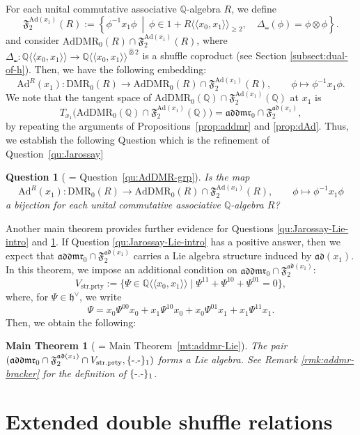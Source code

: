 \documentclass[15pt,oneside,reqno]{amsart}
\newtheorem{qu}[df]{Question}
\newtheorem{mt}{Main Theorem}
\theoremstyle{remark}{
\newtheorem{lem}[df]{Lemma}
\newtheorem{prop}[df]{Proposition}
\newtheorem{ex}[df]{Example}
\newtheorem{rmk}[df]{Remark}
}
\newcommand{\ide}[1]{\mathfrak{#1}}
\newcommand{\Q}{\mathbb{Q}}
\newcommand{\DMR}{\mathrm{DMR}}
\newcommand{\AdDMR}{\mathrm{AdDMR}}
\newcommand{\addmr}{\mathfrak{addmr}}
\newcommand{\Ad}{\mathrm{Ad}}
\newcommand{\ad}{\mathfrak{ad}}
\newcommand{\Fad}{\mathfrak{F}_2^{\ad(x_1)}}
\newcommand{\FAd}{\mathfrak{F}_2^{\Ad(x_1)}}
\newcommand{\cotimes}{\widehat{\otimes}}
\newcommand{\strprty}{\mathrm{str.prty}}
\begin{document}
For each unital commutative associative $\Q$-algebra $R$, we define
\[
\FAd(R)
:=
\left\{
\phi^{-1}x_1\phi
\ \middle|\
\phi\in 1+R\langle\langle x_0,x_1\rangle\rangle_{\ge 2},
\quad
\Delta_{\shuffle}(\phi)=\phi\otimes\phi
\right\}.
\]
and consider $\AdDMR_0(R) \cap \FAd(R)$, where $\Delta_{\shuffle} : \Q\langle\langle x_0,x_1 \rangle\rangle \rightarrow \Q\langle\langle x_0,x_1 \rangle\rangle^{\cotimes 2}$ is a shuffle coproduct (see Section \ref{subsect:dual-of-h}).
Then, we have the following embedding:
\[
\Ad^R(x_1)\colon \DMR_0(R) \longrightarrow \AdDMR_0(R) \cap \FAd(R),\qquad \phi \longmapsto \phi^{-1} x_1 \phi.
\]
We note that the tangent space of $\AdDMR_0(\Q)\cap \FAd(\Q)$ at $x_1$ is
\[
T_{x_1}\bigl(\AdDMR_0(\Q)\cap \FAd(\Q)\bigr)=\addmr_0 \cap \Fad,
\]
by repeating the arguments of Propositions~\ref{prop:addmr} and \ref{prop:dAd}.
Thus, we establish the following Question which is the refinement of Question~\ref{qu:Jarossay}
\begin{qu}[ = Question~\ref{qu:AdDMR-grp}]\label{qu:AdDMR-grp-intro}
Is the map
\[
\Ad^R(x_1)\colon \DMR_0(R) \longrightarrow \AdDMR_0(R)\cap \FAd(R),\qquad \phi \longmapsto \phi^{-1} x_1 \phi
\]
a bijection for each unital commutative associative $\Q$-algebra $R$?
\end{qu}
Another main theorem provides further evidence for Questions \ref{qu:Jarossay-Lie-intro} and \ref{qu:AdDMR-grp-intro}.
If Question \ref{qu:Jarossay-Lie-intro} has a positive answer, then we expect that $\addmr_0 \cap \Fad$ carries a Lie algebra structure induced by $\ad(x_1)$.
In this theorem, we impose an additional condition on $\addmr_0 \cap \Fad$:
\[
V_{\strprty} := \{\Psi \in \Q\langle\langle x_0,x_1 \rangle\rangle \mid \Psi^{11} + \Psi^{10} + \Psi^{01} = 0\},
\]
where, for $\Psi \in \ide{h}^{\vee}$, we write
\[
\Psi = x_0 \Psi^{00} x_0 + x_1 \Psi^{10} x_0 + x_0 \Psi^{01} x_1 + x_1 \Psi^{11} x_1.
\]
Then, we obtain the following:
\begin{mt}[ = Main Theorem~\ref{mt:addmr-Lie}]
The pair $(\addmr_0 \cap \Fad \cap V_{\strprty}, \{\mathchar`-.\mathchar`-\}_1)$ forms a Lie algebra. See Remark \ref{rmk:addmr-bracker} for the definition of $\{\mathchar`-.\mathchar`-\}_1$.
\end{mt}




\section{Extended double shuffle relations}\label{sect:EDSR}
\end{document}
